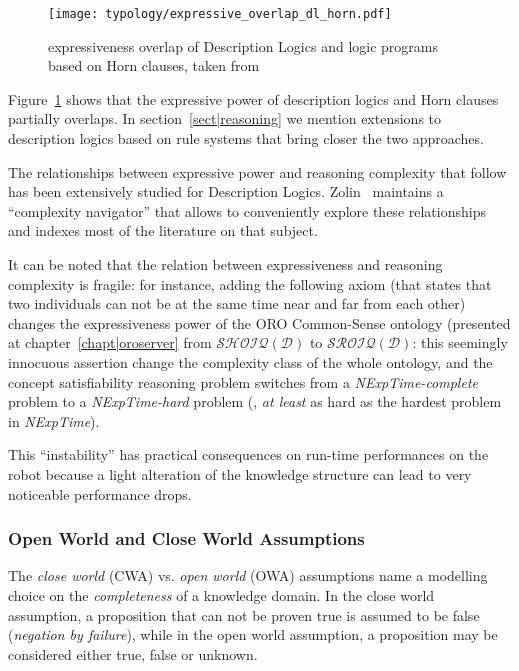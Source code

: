 \begin{figure}
    \centering
    \texttt{[image: typology/expressive\_overlap\_dl\_horn.pdf]}
    \caption{expressiveness overlap of Description Logics and logic programs
    based on Horn clauses, taken from~\cite{Grosof2003}}
    \label{fig|overlap_dl_horn}
\end{figure}

Figure~\ref{fig|overlap_dl_horn} shows that the expressive power of description
logics and Horn clauses partially overlaps. In section~\ref{sect|reasoning} we
mention extensions to description logics based on rule systems that bring closer
the two approaches.

The relationships between expressive power and reasoning complexity that follow
has been extensively studied for Description Logics.
Zolin~\cite{ZolinDLComplexityNavigator} maintains a ``complexity navigator''
that allows to conveniently explore these relationships and indexes most of the
literature on that subject.

It can be noted that the relation between expressiveness and reasoning
complexity is fragile: for instance, adding the following axiom  (that states that two individuals can not be at the
same time near and far from each other) changes the expressiveness power of
the ORO Common-Sense ontology (presented at chapter~\ref{chapt|oroserver}
from $\mathcal{SHOIQ(D)}$ to $\mathcal{SROIQ(D)}$: this seemingly innocuous
assertion change the complexity class of the whole ontology, and the concept
satisfiability reasoning problem switches from a {\it NExpTime-complete}
problem to a {\it NExpTime-hard} problem (\ie, \emph{at least} as hard as the
hardest problem in {\it NExpTime}).

This ``instability'' has practical consequences on run-time performances on
the robot because a light alteration of the knowledge structure can lead to
very noticeable performance drops.


\subsubsection{Open World and Close World Assumptions}
\label{sect|owa-cwa}

The \emph{close world} (CWA) vs. \emph{open world} (OWA) assumptions name a
modelling choice on the \emph{completeness} of a knowledge domain. In the close
world assumption, a proposition that can not be proven true is assumed to be
false (\emph{negation by failure}), while in the open world assumption, a
proposition may be considered either true, false or unknown.

